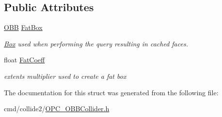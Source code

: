 \subsection*{Public Attributes}
\begin{DoxyCompactItemize}
\item 
\hyperlink{classOBB}{O\+BB} \hyperlink{structOBBCache_a732722cc39003e86a3204ff3cbcf3003}{Fat\+Box}\hypertarget{structOBBCache_a732722cc39003e86a3204ff3cbcf3003}{}\label{structOBBCache_a732722cc39003e86a3204ff3cbcf3003}

\begin{DoxyCompactList}\small\item\em \hyperlink{classBox}{Box} used when performing the query resulting in cached faces. \end{DoxyCompactList}\item 
float \hyperlink{structOBBCache_ae7cfbbbb388fc4b0df6c5eac57f7fc6f}{Fat\+Coeff}\hypertarget{structOBBCache_ae7cfbbbb388fc4b0df6c5eac57f7fc6f}{}\label{structOBBCache_ae7cfbbbb388fc4b0df6c5eac57f7fc6f}

\begin{DoxyCompactList}\small\item\em extents multiplier used to create a fat box \end{DoxyCompactList}\end{DoxyCompactItemize}


The documentation for this struct was generated from the following file\+:\begin{DoxyCompactItemize}
\item 
cmd/collide2/\hyperlink{OPC__OBBCollider_8h}{O\+P\+C\+\_\+\+O\+B\+B\+Collider.\+h}\end{DoxyCompactItemize}
